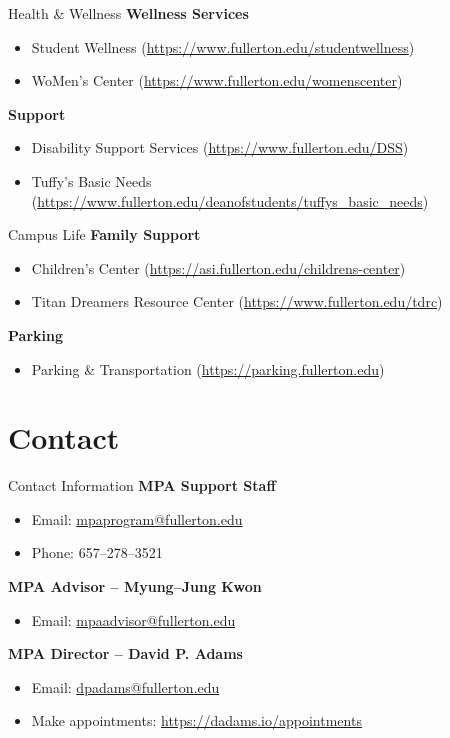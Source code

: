 \documentclass[10pt]{beamer}
\begin{document}
\begin{frame}{Health \& Wellness}
\textbf{Wellness Services}
\begin{itemize}
  \item Student Wellness \small(\url{https://www.fullerton.edu/studentwellness})
  \item WoMen's Center \small(\url{https://www.fullerton.edu/womenscenter})
\end{itemize}

\textbf{Support}
\begin{itemize}
  \item Disability Support Services \small(\url{https://www.fullerton.edu/DSS})
  \item Tuffy's Basic Needs \small(\url{https://www.fullerton.edu/deanofstudents/tuffys_basic_needs})
\end{itemize}
\end{frame}

\begin{frame}{Campus Life}
\textbf{Family Support}
\begin{itemize}
  \item Children's Center \small(\url{https://asi.fullerton.edu/childrens-center})
  \item Titan Dreamers Resource Center \small(\url{https://www.fullerton.edu/tdrc})
\end{itemize}

\textbf{Parking}
\begin{itemize}
  \item Parking \& Transportation \small(\url{https://parking.fullerton.edu})
\end{itemize}
\end{frame}

\section{\textcolor{titanorange}{Contact}}
\begin{frame}{Contact Information}
\textbf{MPA Support Staff}\\[-2pt]
\begin{itemize}
  \item Email: \href{mailto:mpaprogram@fullerton.edu}{mpaprogram@fullerton.edu}
  \item Phone: 657--278--3521
\end{itemize}

\textbf{MPA Advisor -- Myung--Jung Kwon}\\[-2pt]
\begin{itemize}
  \item Email: \href{mailto:mpaadvisor@fullerton.edu}{mpaadvisor@fullerton.edu}
\end{itemize}

\textbf{MPA Director -- David P. Adams}\\[-2pt]
\begin{itemize}
  \item Email: \href{mailto:dpadams@fullerton.edu}{dpadams@fullerton.edu}
  \item Make appointments: \url{https://dadams.io/appointments}
\end{itemize}
\end{frame}
\end{document}
